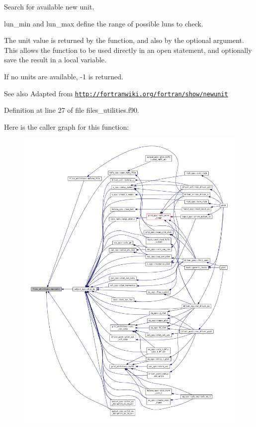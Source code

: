 Search for available new unit. 

{\ttfamily lun\+\_\+min} and {\ttfamily lun\+\_\+max} define the range of possible luns to check.

The unit value is returned by the function, and also by the optional argument. This allows the function to be used directly in an open statement, and optionally save the result in a local variable.

If no units are available, -\/1 is returned.

\begin{DoxySeeAlso}{See also}
Adapted from \href{http://fortranwiki.org/fortran/show/newunit}{\tt http\+://fortranwiki.\+org/fortran/show/newunit} 
\end{DoxySeeAlso}


Definition at line 27 of file files\+\_\+utilities.\+f90.

Here is the caller graph for this function\+:
\nopagebreak
\begin{figure}[H]
\begin{center}
\leavevmode
\includegraphics[width=350pt]{namespacefiles__utilities_ac6066df405564ba2f5e3c4bba726c1f8_icgraph}
\end{center}
\end{figure}
\mbox{\label{namespacefiles__utilities_ac5befac3b753b28003e6878bec2af381}} 
